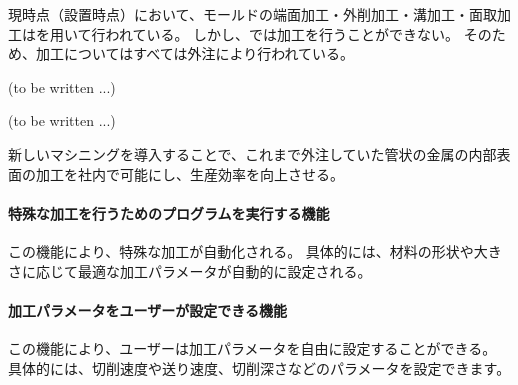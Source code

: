




現時点（\DMname 設置時点）において、モールドの端面加工・外削加工・溝加工・面取加工は\MMname を用いて行われている。
しかし、\MMname では\dimple 加工を行うことができない。
そのため、\dimple 加工についてはすべては外注により行われている。


(to be written ...)




(to be written ...)



新しいマシニングを導入することで、これまで外注していた管状の金属の内部表面の加工を社内で可能にし、生産効率を向上させる。



\paragraph*{特殊な加工を行うためのプログラムを実行する機能}
この機能により、特殊な加工が自動化される。
具体的には、材料の形状や大きさに応じて最適な加工パラメータが自動的に設定される。

\paragraph*{加工パラメータをユーザーが設定できる機能}
この機能により、ユーザーは加工パラメータを自由に設定することができる。
具体的には、切削速度や送り速度、切削深さなどのパラメータを設定できます。


